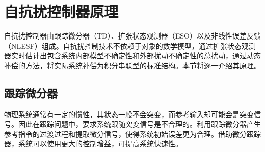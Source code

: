 \section{自抗扰控制器原理}
自抗扰控制器由跟踪微分器（TD）、扩张状态观测器（ESO）以及非线性误差反馈（NLESF）组成。自抗扰控制技术不依赖于对象的数学模型，通过扩张状态观测器实时估计出包含系统内部模型不确定性和外部扰动不确定性的总扰动，通过动态补偿的方法，将实际系统补偿为积分串联型的标准结构。本节将逐一介绍其原理。
\subsection{跟踪微分器}
物理系统通常有一定的惯性，其状态一般不会突变，而参考输入却可能会是突变信号。因此在跟踪问题中，要求系统跟随突变信号是不合理的。利用跟踪微分器产生参考指令的过渡过程和提取微分信号，使得系统初始误差更为合理。借助微分跟踪器，系统可以使用更大的控制增益，可提高系统快速性。

